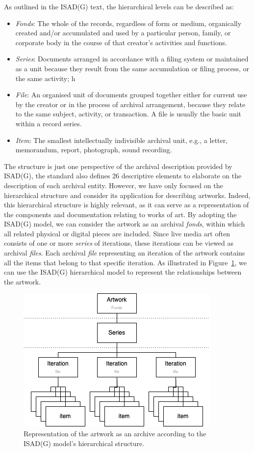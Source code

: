 As outlined in the ISAD(G) text, the hierarchical levels can be described as:
\begin{itemize}
    \item \textit{Fonds}: The whole of the records, regardless of form or medium, organically created and/or accumulated and used by a particular person, family, or corporate body in the course of that creator's activities and functions.
    \item \textit{Series}: Documents arranged in accordance with a filing system or maintained as a unit because they result from the same accumulation or filing process, or the same activity; h
    \item \textit{File}: An organised unit of documents grouped together either for current use by the creator or in the process of archival arrangement, because they relate to the same subject, activity, or transaction. A file is usually the basic unit within a record series.
    \item \textit{Item}: The smallest intellectually indivisible archival unit, e.g., a letter, memorandum, report, photograph, sound recording.
\end{itemize}
The structure is just one perspective of the archival description provided by ISAD(G), the standard also defines 26 descriptive elements to elaborate on the description of each archival entity. However, we have only focused on the hierarchical structure and consider its application for describing artworks. Indeed, this hierarchical structure is highly relevant, as it can serve as a representation of the components and documentation relating to works of art. By adopting the ISAD(G) model, we can consider the artwork as an archival \textit{fonds}, within which all related physical or digital pieces are included. Since live media art often consists of one or more \textit{series} of iterations, these iterations can be viewed as archival \textit{files}. Each archival \textit{file} representing an iteration of the artwork contains all the items that belong to that specific iteration. As illustrated in Figure~\ref{fig:c3-isadg_art}, we can use the ISAD(G) hierarchical model to represent the relationships between the artwork.

\begin{figure}[!h]
    \centering
    \includegraphics[width=0.7\linewidth]{chapters/3-mdc_model-reactivation_workflow-instruction_template/image/graph03-isadg_art.png}
    \caption{Representation of the artwork as an archive according to the ISAD(G) model’s hierarchical structure.}
    \label{fig:c3-isadg_art}
\end{figure} 

